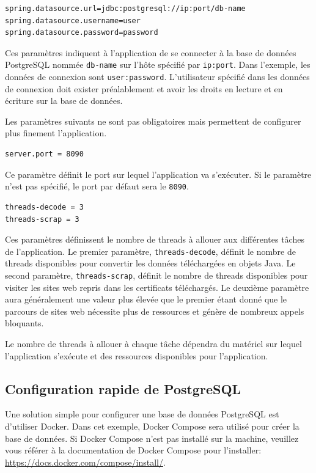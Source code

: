 \documentclass{article}
\begin{document}
\begin{verbatim}
spring.datasource.url=jdbc:postgresql://ip:port/db-name
spring.datasource.username=user
spring.datasource.password=password
\end{verbatim}

Ces paramètres indiquent à l'application de se connecter à la base de données PostgreSQL nommée \texttt{db-name} sur l'hôte spécifié par \texttt{ip:port}.  Dans l'exemple, les données de connexion sont \texttt{user:password}.  L'utilisateur spécifié dans les données de connexion doit exister préalablement et avoir les droits en lecture et en écriture sur la base de données.

Les paramètres suivants ne sont pas obligatoires mais permettent de configurer plus finement l'application.

\begin{verbatim}
server.port = 8090
\end{verbatim}

Ce paramètre définit le port sur lequel l'application va s'exécuter.  Si le paramètre n'est pas spécifié, le port par défaut sera le \texttt{8090}.

\begin{verbatim}
threads-decode = 3
threads-scrap = 3
\end{verbatim}

Ces paramètres définissent le nombre de threads à allouer aux différentes tâches de l'application.  Le premier paramètre, \texttt{threads-decode}, définit le nombre de threads disponibles pour convertir les données téléchargées en objets Java.  Le second paramètre, \texttt{threads-scrap}, définit le nombre de threads disponibles pour visiter les sites web repris dans les certificats téléchargés.  Le deuxième paramètre aura généralement une valeur plus élevée que le premier étant donné que le parcours de sites web nécessite plus de ressources et génère de nombreux appels bloquants.

Le nombre de threads à allouer à chaque tâche dépendra du matériel sur lequel l'application s'exécute et des ressources disponibles pour l'application.

\subsection{Configuration rapide de PostgreSQL}

Une solution simple pour configurer une base de données PostgreSQL est d'utiliser Docker.  Dans cet exemple, Docker Compose sera utilisé pour créer la base de données.  Si Docker Compose n'est pas installé sur la machine, veuillez vous référer à la documentation de Docker Compose pour l'installer: \url{https://docs.docker.com/compose/install/}.
\end{document}
